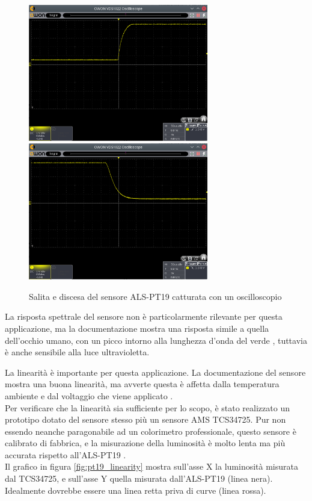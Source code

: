 \begin{figure}[h!]
	\centering
	\includegraphics[width=0.7\textwidth]{Dispositivo_files/sensor_scope_rise.png}
	\includegraphics[width=0.7\textwidth]{Dispositivo_files/sensor_scope_fall.png}
	\caption{Salita e discesa del sensore ALS-PT19 catturata con un oscilloscopio}
	\label{fig:sensor_scope_risefall}
\end{figure}

La risposta spettrale del sensore non è particolarmente rilevante per questa applicazione, ma la documentazione mostra una risposta simile a quella dell'occhio umano, con un picco intorno alla lunghezza d'onda del verde \cite{als_pt19_datasheet}, tuttavia è anche sensibile alla luce ultravioletta.

La linearità è importante per questa applicazione. La documentazione del sensore mostra una buona linearità, ma avverte questa è affetta dalla temperatura ambiente e dal voltaggio che viene applicato \cite{als_pt19_datasheet}.\\
Per verificare che la linearità sia sufficiente per lo scopo, è stato realizzato un prototipo dotato del sensore stesso più un sensore AMS TCS34725. Pur non essendo neanche paragonabile ad un colorimetro professionale, questo sensore è calibrato di fabbrica, e la misurazione della luminosità è molto lenta ma più accurata rispetto all'ALS-PT19 \cite{tcs34725_datasheet}.\\
Il grafico in figura \ref{fig:pt19_linearity} mostra sull'asse X la luminosità misurata dal TCS34725, e sull'asse Y quella misurata dall'ALS-PT19 (linea nera). Idealmente dovrebbe essere una linea retta priva di curve (linea rossa).

